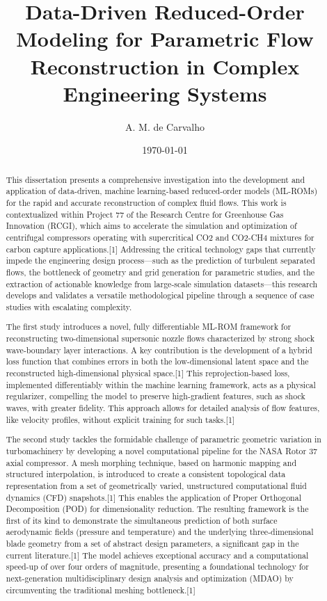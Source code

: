 \documentclass[12pt, a4paper]{report}
\begin{document}
\title{Data-Driven Reduced-Order Modeling for Parametric Flow Reconstruction in Complex Engineering Systems}
\author{A. M. de Carvalho}
\date{\today}
\maketitle

\begin{abstract}
This dissertation presents a comprehensive investigation into the development and application of data-driven, machine learning-based reduced-order models (ML-ROMs) for the rapid and accurate reconstruction of complex fluid flows. This work is contextualized within Project 77 of the Research Centre for Greenhouse Gas Innovation (RCGI), which aims to accelerate the simulation and optimization of centrifugal compressors operating with supercritical CO2 and CO2-CH4 mixtures for carbon capture applications.[1] Addressing the critical technology gaps that currently impede the engineering design process—such as the prediction of turbulent separated flows, the bottleneck of geometry and grid generation for parametric studies, and the extraction of actionable knowledge from large-scale simulation datasets—this research develops and validates a versatile methodological pipeline through a sequence of case studies with escalating complexity.

The first study introduces a novel, fully differentiable ML-ROM framework for reconstructing two-dimensional supersonic nozzle flows characterized by strong shock wave-boundary layer interactions. A key contribution is the development of a hybrid loss function that combines errors in both the low-dimensional latent space and the reconstructed high-dimensional physical space.[1] This reprojection-based loss, implemented differentiably within the machine learning framework, acts as a physical regularizer, compelling the model to preserve high-gradient features, such as shock waves, with greater fidelity. This approach allows for detailed analysis of flow features, like velocity profiles, without explicit training for such tasks.[1]

The second study tackles the formidable challenge of parametric geometric variation in turbomachinery by developing a novel computational pipeline for the NASA Rotor 37 axial compressor. A mesh morphing technique, based on harmonic mapping and structured interpolation, is introduced to create a consistent topological data representation from a set of geometrically varied, unstructured computational fluid dynamics (CFD) snapshots.[1] This enables the application of Proper Orthogonal Decomposition (POD) for dimensionality reduction. The resulting framework is the first of its kind to demonstrate the simultaneous prediction of both surface aerodynamic fields (pressure and temperature) and the underlying three-dimensional blade geometry from a set of abstract design parameters, a significant gap in the current literature.[1] The model achieves exceptional accuracy and a computational speed-up of over four orders of magnitude, presenting a foundational technology for next-generation multidisciplinary design analysis and optimization (MDAO) by circumventing the traditional meshing bottleneck.[1]


\end{abstract}
\end{document}
